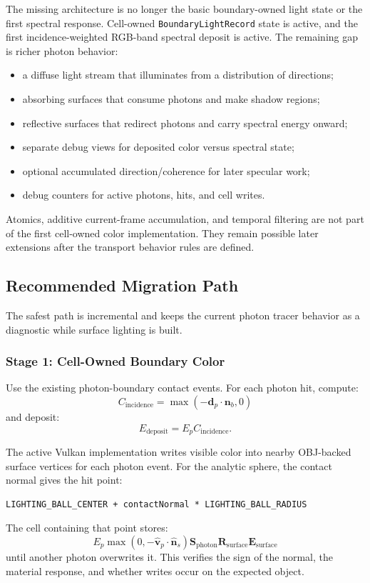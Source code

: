 The missing architecture is no longer the basic boundary-owned light state or
the first spectral response.  Cell-owned \texttt{BoundaryLightRecord} state is
active, and the first incidence-weighted RGB-band spectral deposit is active.
The remaining gap is richer photon behavior:
\begin{itemize}
    \item a diffuse light stream that illuminates from a distribution of
          directions;
    \item absorbing surfaces that consume photons and make shadow regions;
    \item reflective surfaces that redirect photons and carry spectral energy
          onward;
    \item separate debug views for deposited color versus spectral state;
    \item optional accumulated direction/coherence for later specular work;
    \item debug counters for active photons, hits, and cell writes.
\end{itemize}
Atomics, additive current-frame accumulation, and temporal filtering are not
part of the first cell-owned color implementation.  They remain possible later
extensions after the transport behavior rules are defined.

\subsection{Recommended Migration Path}

The safest path is incremental and keeps the current photon tracer behavior as
a diagnostic while surface lighting is built.

\subsubsection{Stage 1: Cell-Owned Boundary Color}

Use the existing photon-boundary contact events.  For each photon hit, compute:
\[
    C_{\mathrm{incidence}} =
    \max(-\mathbf d_p \cdot \mathbf n_b, 0)
\]
and deposit:
\[
    E_{\mathrm{deposit}} =
    E_p C_{\mathrm{incidence}} .
\]

The active Vulkan implementation writes visible color into nearby
OBJ-backed surface vertices for each photon event.  For the analytic sphere,
the contact normal gives the hit point:
\begin{verbatim}
LIGHTING_BALL_CENTER + contactNormal * LIGHTING_BALL_RADIUS
\end{verbatim}
The cell containing that point stores:
\[
    E_p
    \max \left(0, -\hat{\mathbf v}_{p} \cdot \hat{\mathbf n}_{s}\right)
    \mathbf S_{\mathrm{photon}}
    \mathbf R_{\mathrm{surface}}
    \mathbf E_{\mathrm{surface}}
\]
until another photon overwrites it.  This verifies the sign of the normal,
the material response, and whether writes occur on the expected object.

